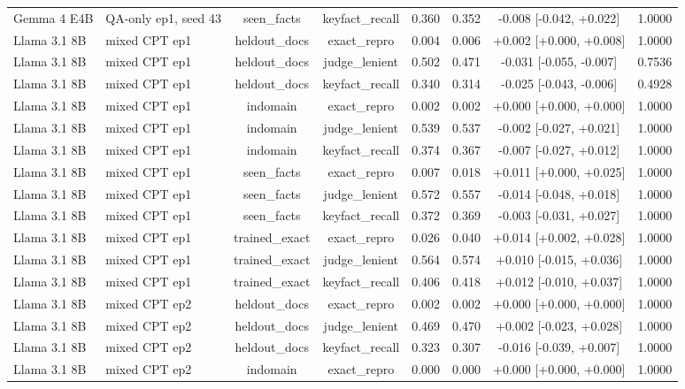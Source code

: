\begin{table}[t]
{\begin{tabular}{llcccccc}
Gemma 4 E4B & QA-only ep1, seed 43 & seen\_facts & keyfact\_recall & 0.360 & 0.352 & -0.008 [-0.042, +0.022] & 1.0000 \\
Llama 3.1 8B & mixed CPT ep1 & heldout\_docs & exact\_repro & 0.004 & 0.006 & +0.002 [+0.000, +0.008] & 1.0000 \\
Llama 3.1 8B & mixed CPT ep1 & heldout\_docs & judge\_lenient & 0.502 & 0.471 & -0.031 [-0.055, -0.007] & 0.7536 \\
Llama 3.1 8B & mixed CPT ep1 & heldout\_docs & keyfact\_recall & 0.340 & 0.314 & -0.025 [-0.043, -0.006] & 0.4928 \\
Llama 3.1 8B & mixed CPT ep1 & indomain & exact\_repro & 0.002 & 0.002 & +0.000 [+0.000, +0.000] & 1.0000 \\
Llama 3.1 8B & mixed CPT ep1 & indomain & judge\_lenient & 0.539 & 0.537 & -0.002 [-0.027, +0.021] & 1.0000 \\
Llama 3.1 8B & mixed CPT ep1 & indomain & keyfact\_recall & 0.374 & 0.367 & -0.007 [-0.027, +0.012] & 1.0000 \\
Llama 3.1 8B & mixed CPT ep1 & seen\_facts & exact\_repro & 0.007 & 0.018 & +0.011 [+0.000, +0.025] & 1.0000 \\
Llama 3.1 8B & mixed CPT ep1 & seen\_facts & judge\_lenient & 0.572 & 0.557 & -0.014 [-0.048, +0.018] & 1.0000 \\
Llama 3.1 8B & mixed CPT ep1 & seen\_facts & keyfact\_recall & 0.372 & 0.369 & -0.003 [-0.031, +0.027] & 1.0000 \\
Llama 3.1 8B & mixed CPT ep1 & trained\_exact & exact\_repro & 0.026 & 0.040 & +0.014 [+0.002, +0.028] & 1.0000 \\
Llama 3.1 8B & mixed CPT ep1 & trained\_exact & judge\_lenient & 0.564 & 0.574 & +0.010 [-0.015, +0.036] & 1.0000 \\
Llama 3.1 8B & mixed CPT ep1 & trained\_exact & keyfact\_recall & 0.406 & 0.418 & +0.012 [-0.010, +0.037] & 1.0000 \\
Llama 3.1 8B & mixed CPT ep2 & heldout\_docs & exact\_repro & 0.002 & 0.002 & +0.000 [+0.000, +0.000] & 1.0000 \\
Llama 3.1 8B & mixed CPT ep2 & heldout\_docs & judge\_lenient & 0.469 & 0.470 & +0.002 [-0.023, +0.028] & 1.0000 \\
Llama 3.1 8B & mixed CPT ep2 & heldout\_docs & keyfact\_recall & 0.323 & 0.307 & -0.016 [-0.039, +0.007] & 1.0000 \\
Llama 3.1 8B & mixed CPT ep2 & indomain & exact\_repro & 0.000 & 0.000 & +0.000 [+0.000, +0.000] & 1.0000 \\

\end{tabular}}
\end{table}
